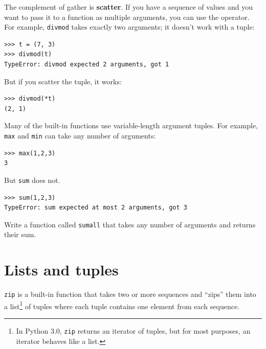 \documentclass[10pt]{book}
\begin{document}

The complement of gather is {\bf scatter}.  If you have a
sequence of values and you want to pass it to a function
as multiple arguments, you can use the {\tt *} operator.
For example, {\tt divmod} takes exactly two arguments; it
doesn't work with a tuple:


\beforeverb
\begin{verbatim}
>>> t = (7, 3)
>>> divmod(t)
TypeError: divmod expected 2 arguments, got 1
\end{verbatim}
\afterverb
%
But if you scatter the tuple, it works:

\beforeverb
\begin{verbatim}
>>> divmod(*t)
(2, 1)
\end{verbatim}
\afterverb
%

\begin{ex}
Many of the built-in functions use
variable-length argument tuples.  For example, {\tt max}
and {\tt min} can take any number of arguments:


\beforeverb
\begin{verbatim}
>>> max(1,2,3)
3
\end{verbatim}
\afterverb
%
But {\tt sum} does not.


\beforeverb
\begin{verbatim}
>>> sum(1,2,3)
TypeError: sum expected at most 2 arguments, got 3
\end{verbatim}
\afterverb
%
Write a function called {\tt sumall} that takes any number
of arguments and returns their sum.

\end{ex}


\section{Lists and tuples}


{\tt zip} is a built-in function that takes two or more sequences and
``zips'' them into a list\footnote{In Python 3.0, {\tt zip} returns an
  iterator of tuples, but for most purposes, an iterator behaves like
  a list.} of tuples where each tuple contains one element from each
sequence.
\end{document}
